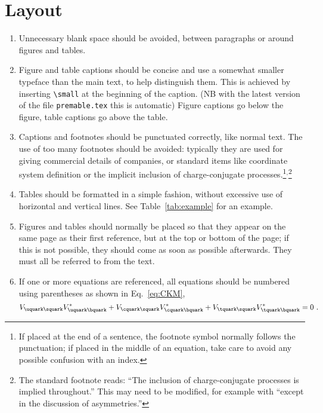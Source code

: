 \section{Layout}

\begin{enumerate}

\item Unnecessary blank space should be avoided, between paragraphs or
  around figures and tables.

\item Figure and table captions should be concise and use a somewhat smaller typeface
  than the main text, to help distinguish them. This is achieved by 
  inserting \verb!\small! at the beginning of the caption.
  (NB with the latest version of the file \verb!premable.tex! this is automatic)
  Figure captions go below the figure, table captions go above the
  table.

\item Captions and footnotes should be punctuated correctly, like
  normal text. The use of too many footnotes should be avoided:
  typically they are used for giving commercial details of companies,
  or standard items like coordinate system definition or the implicit
  inclusion of charge-conjugate processes.\footnote{If placed at the end
    of a sentence, the footnote symbol normally follows the
    punctuation; if placed in the middle of an equation, take care to
    avoid any possible confusion with an index.}$^,$\footnote{The standard footnote reads: ``The inclusion of charge-conjugate processes is implied
    throughout.'' This may need to be modified, for example with ``except in the discussion of asymmetries.''}

\item Tables should be formatted in a simple fashion, without
  excessive use of horizontal and vertical lines. See
  Table~\ref{tab:example} for an example.

\item Figures and tables should normally be placed so that they appear
  on the same page as their first reference, but at the top or bottom
  of the page; if this is not possible, they should come as soon as
  possible afterwards.  They must all be referred to from the text.

\item If one or more equations are referenced, all equations should be numbered using parentheses as shown in
  Eq.~\ref{eq:CKM},
  \begin{equation}
    \label{eq:CKM}
    V_{\uquark\squark}V_{\uquark\bquark}^* + 
    V_{\cquark\squark}V_{\cquark\bquark}^* + 
    V_{\tquark\squark}V_{\tquark\bquark}^* = 0 \ . 
  \end{equation}
  

\end{enumerate}
